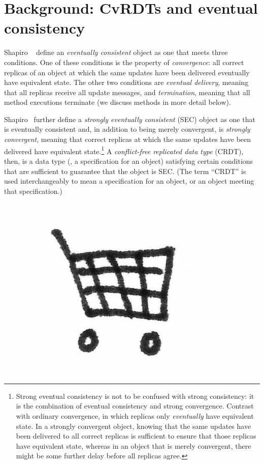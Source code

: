 \section{Background: CvRDTs and eventual consistency}\label{s:distributed-cvrdts}

Shapiro \etal~\cite{crdts, crdts-tr} define an \emph{eventually
  consistent} object as one that meets three conditions.  One of these
conditions is the property of \emph{convergence}: all correct replicas
of an object at which the same updates have been delivered eventually
have equivalent state.  The other two conditions are \emph{eventual
  delivery}, meaning that all replicas receive all update messages,
and \emph{termination}, meaning that all method executions terminate
(we discuss methods in more detail below).

Shapiro \etal~further define a \emph{strongly eventually consistent}
(SEC) object as one that is eventually consistent and, in addition to
being merely convergent, is \emph{strongly convergent}, meaning that
correct replicas at which the same updates have been delivered have
equivalent state.\footnote{ Strong eventual consistency is not to be
  confused with strong consistency: it is the combination of eventual
  consistency and strong convergence.  Contrast with ordinary
  convergence, in which replicas only \emph{eventually} have
  equivalent state.  In a strongly convergent object, knowing that the
  same updates have been delivered to all correct replicas is
  sufficient to ensure that those replicas have equivalent state,
  whereas in an object that is merely convergent, there might be some
  further delay before all replicas agree.}  A \emph{conflict-free
  replicated data type} (CRDT), then, is a data type (\ie, a
specification for an object) satisfying certain conditions that are
sufficient to guarantee that the object is SEC.  (The term ``CRDT'' is
used interchangeably to mean a specification for an object, or an
object meeting that specification.)

\ifdefined\DISSERTATION
\begin{figure}
\vspace{-2em}
\begin{center}
  \includegraphics[scale=0.2]{../illustrations/shopping-cart}
\end{center}
\vspace{-1.5em}
\end{figure}
\fi 

